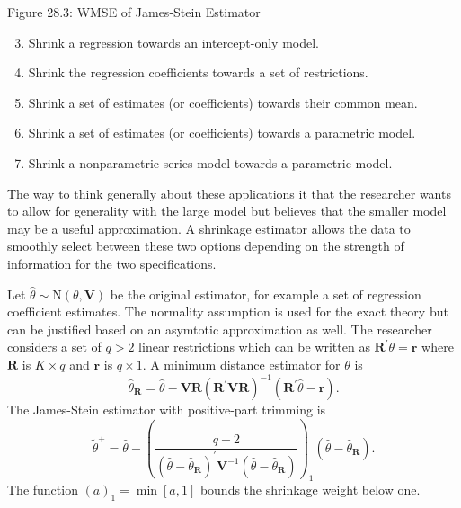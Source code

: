 \documentclass[10pt]{article}
\begin{document}
Figure 28.3: WMSE of James-Stein Estimator

\begin{enumerate}
  \setcounter{enumi}{2}
  \item Shrink a regression towards an intercept-only model.

  \item Shrink the regression coefficients towards a set of restrictions.

  \item Shrink a set of estimates (or coefficients) towards their common mean.

  \item Shrink a set of estimates (or coefficients) towards a parametric model.

  \item Shrink a nonparametric series model towards a parametric model.

\end{enumerate}
The way to think generally about these applications it that the researcher wants to allow for generality with the large model but believes that the smaller model may be a useful approximation. A shrinkage estimator allows the data to smoothly select between these two options depending on the strength of information for the two specifications.

Let $\widehat{\theta} \sim \mathrm{N}(\theta, \boldsymbol{V})$ be the original estimator, for example a set of regression coefficient estimates. The normality assumption is used for the exact theory but can be justified based on an asymtotic approximation as well. The researcher considers a set of $q>2$ linear restrictions which can be written as $\boldsymbol{R}^{\prime} \theta=\boldsymbol{r}$ where $\boldsymbol{R}$ is $K \times q$ and $\boldsymbol{r}$ is $q \times 1$. A minimum distance estimator for $\theta$ is
$$
\widehat{\theta}_{\boldsymbol{R}}=\widehat{\theta}-\boldsymbol{V} \boldsymbol{R}\left(\boldsymbol{R}^{\prime} \boldsymbol{V} \boldsymbol{R}\right)^{-1}\left(\boldsymbol{R}^{\prime} \widehat{\theta}-\boldsymbol{r}\right) .
$$
The James-Stein estimator with positive-part trimming is
$$
\widetilde{\theta}^{+}=\widehat{\theta}-\left(\frac{q-2}{\left(\widehat{\theta}-\widehat{\theta}_{\boldsymbol{R}}\right)^{\prime} \boldsymbol{V}^{-1}\left(\widehat{\theta}-\widehat{\theta}_{\boldsymbol{R}}\right)}\right)_{1}\left(\widehat{\theta}-\widehat{\theta}_{\boldsymbol{R}}\right) .
$$
The function $(a)_{1}=\min [a, 1]$ bounds the shrinkage weight below one.
\end{document}
